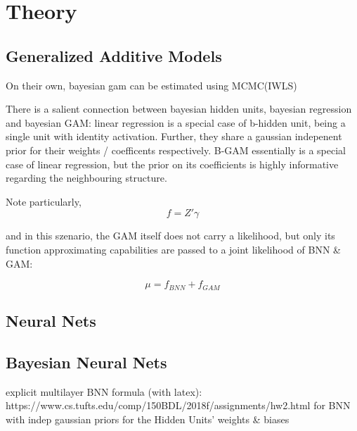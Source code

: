 \documentclass[11pt]{article}
\begin{document}
    \clearpage
    \section{Theory}
        \subsection{Generalized Additive Models}
        On their own, bayesian gam can be estimated using MCMC(IWLS) \citep{} %

        There is a salient connection between bayesian hidden units, bayesian regression and bayesian GAM:
        linear regression is a special case of b-hidden unit, being a single unit with identity activation. Further, they share a gaussian indepenent prior for their weights / coefficents respectively. B-GAM essentially is a special case of linear regression, but the prior on its coefficients is highly informative regarding the neighbouring structure.

        Note particularly,
        \begin{equation}
            f = Z'\gamma
        \end{equation}

        and in this szenario, the GAM itself does not carry a likelihood, but only its function approximating capabilities are passed to a joint likelihood of BNN & GAM:

        \begin{equation}
            \mu = f_{BNN} + f_{GAM}
        \end{equation}


        \subsection{Neural Nets}
        \subsection{Bayesian Neural Nets}
        explicit multilayer BNN formula (with latex): https://www.cs.tufts.edu/comp/150BDL/2018f/assignments/hw2.html
        for BNN with indep gaussian priors for the Hidden Units' weights & biases

\end{document}
